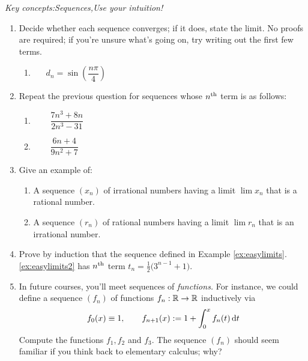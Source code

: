 

\begin{exercises}{}{}
	\emph{Key concepts:\quad Sequences,\quad Use your intuition!}
	
	\begin{enumerate}
	  \item%
	  Decide whether each sequence converges; if it does, state the limit. No proofs are required; if you're unsure what's going on, try writing out the first few terms.
		\begin{enumerate}
	    \item {}\ 
	    \ 
	    \ 
	    $d_n=\sin\left(\dfrac{n\pi}4\right)$
	  \end{enumerate}

	  
	  \item Repeat the previous question for sequences whose $n\textsuperscript{th}$ term is as follows:
	  \begin{enumerate}
	    \item {}\ 
	    \ 
	    \ 
	    \
			$\dfrac{7n^3+8n}{2n^3-31}$
	    \setcounter{enumii}{5}
	    \item {}\ 
	    \ 
	    \ 
	    \ 
	    $\dfrac{6n+4}{9n^2+7}$
	  \end{enumerate}

	  
	  \item Give an example of:
	  \begin{enumerate}
		  \item A sequence $(x_n)$ of irrational numbers having a limit $\lim x_n$ that is a rational number.
		  \item A sequence $(r_n)$ of rational numbers having a limit $\lim r_n$ that is an irrational number.
	  \end{enumerate}
	  
	  
	  \item Prove by induction that the sequence defined in Example \ref*{ex:easylimits}.\ref{ex:easylimits2} has $n\textsuperscript{th}$ term $t_n=\frac 12\bigl(3^{n-1}+1\bigr)$.
	  
	  
	  \item In future courses, you'll meet sequences of \emph{functions.} For instance,  we could define a sequence $(f_n)$ of functions $f_n:\mathbb{R}\to\mathbb{R}$ inductively via
	  \[
	  	f_0(x)\equiv 1,\qquad f_{n+1}(x):=1+\int_0^x f_n(t)\,{\mathrm{d} t}
	  \]
	  Compute the functions $f_1,f_2$ and $f_3$. The sequence $(f_n)$ should seem familiar if you think back to elementary calculus; why?
	\end{enumerate}
\end{exercises}



